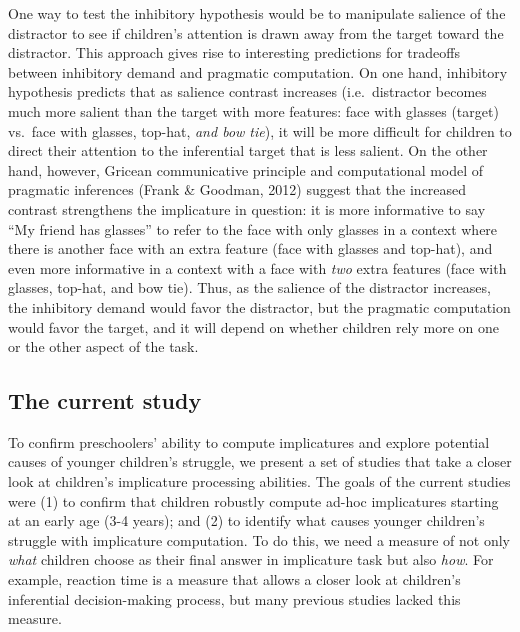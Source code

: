 \documentclass[a4paper,man,apacite,floatsintext]{apa6}
\begin{document}
One way to test the inhibitory hypothesis would be to manipulate
salience of the distractor to see if children's attention is drawn away
from the target toward the distractor. This approach gives rise to
interesting predictions for tradeoffs between inhibitory demand and
pragmatic computation. On one hand, inhibitory hypothesis predicts that
as salience contrast increases (i.e.~distractor becomes much more
salient than the target with more features: face with glasses (target)
vs.~face with glasses, top-hat, \emph{and bow tie}), it will be more
difficult for children to direct their attention to the inferential
target that is less salient. On the other hand, however, Gricean
communicative principle and computational model of pragmatic inferences
(Frank \& Goodman, 2012) suggest that the increased contrast strengthens
the implicature in question: it is more informative to say ``My friend
has glasses'' to refer to the face with only glasses in a context where
there is another face with an extra feature (face with glasses and
top-hat), and even more informative in a context with a face with
\emph{two} extra features (face with glasses, top-hat, and bow tie).
Thus, as the salience of the distractor increases, the inhibitory demand
would favor the distractor, but the pragmatic computation would favor
the target, and it will depend on whether children rely more on one or
the other aspect of the task.

\subsection{The current study}\label{the-current-study}

To confirm preschoolers' ability to compute implicatures and explore
potential causes of younger children's struggle, we present a set of
studies that take a closer look at children's implicature processing
abilities. The goals of the current studies were (1) to confirm that
children robustly compute ad-hoc implicatures starting at an early age
(3-4 years); and (2) to identify what causes younger children's struggle
with implicature computation. To do this, we need a measure of not only
\emph{what} children choose as their final answer in implicature task
but also \emph{how}. For example, reaction time is a measure that allows
a closer look at children's inferential decision-making process, but
many previous studies lacked this measure.
\end{document}
